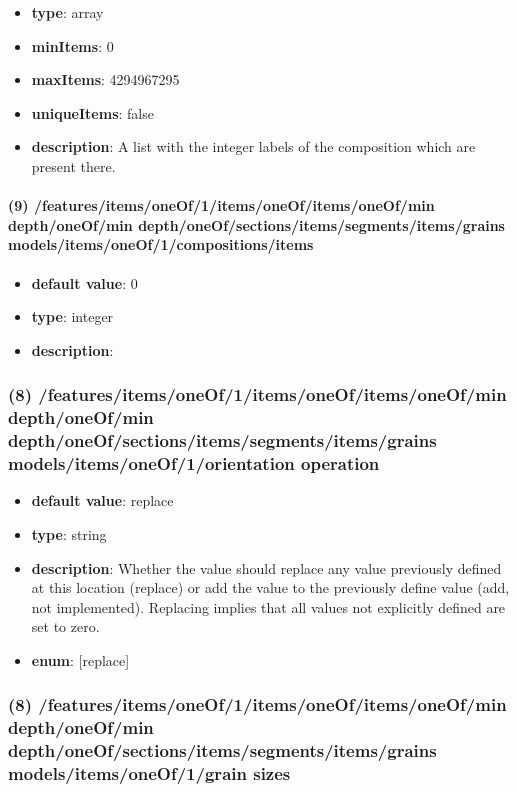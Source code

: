 \begin{itemize}[leftmargin=8em]\item {\bf type}: array
\item {\bf minItems}: 0
\item {\bf maxItems}: 4294967295
\item {\bf uniqueItems}: false
\item {\bf description}: A list with the integer labels of the composition which are present there.
\end{itemize}\paragraph{(9) /features/items/oneOf/1/items/oneOf/items/oneOf/min depth/oneOf/min depth/oneOf/sections/items/segments/items/grains models/items/oneOf/1/compositions/items}
\begin{itemize}[leftmargin=9em]\item {\bf default value}: 0
\item {\bf type}: integer
\item {\bf description}: 
\end{itemize}\subsubsection{(8) /features/items/oneOf/1/items/oneOf/items/oneOf/min depth/oneOf/min depth/oneOf/sections/items/segments/items/grains models/items/oneOf/1/orientation operation}
\begin{itemize}[leftmargin=8em]\item {\bf default value}: replace
\item {\bf type}: string
\item {\bf description}: Whether the value should replace any value previously defined at this location (replace) or add the value to the previously define value (add, not implemented). Replacing implies that all values not explicitly defined are set to zero.
\item {\bf enum}: [replace]\end{itemize}\subsubsection{(8) /features/items/oneOf/1/items/oneOf/items/oneOf/min depth/oneOf/min depth/oneOf/sections/items/segments/items/grains models/items/oneOf/1/grain sizes}

